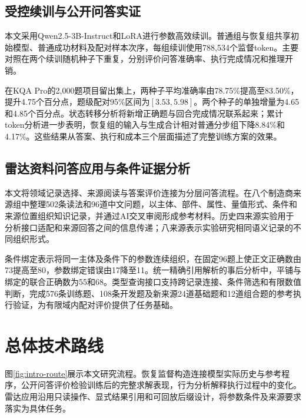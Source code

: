 \subsection{受控续训与公开问答实证}

本文采用Qwen2.5-3B-Instruct和LoRA进行参数高效续训。普通组与恢复组共享初始模型、普通成功材料及配对样本次序，每组续训使用788,534个监督token。主要对照在两个续训随机种子下重复，分别评价问答准确率、执行完成情况和推理开销。

在KQA Pro的2,000题项目留出集上，两种子平均准确率由78.75\%提高至83.50\%，提升4.75个百分点，题级配对95\%区间为$[3.53,5.98]$。两个种子的单独增量为4.65和4.85个百分点。状态转移分析将新增正确题与回合完成情况联系起来；累计token分析进一步表明，恢复组的输入与生成合计相对普通分步组下降8.84\%和4.17\%。这些结果从答案、执行和成本三个层面描述了完整训练方案的效果。

\subsection{雷达资料问答应用与条件证据分析}

本文将领域记录选择、来源阅读与答案评价连接为分层问答流程。在八个制造商来源组中整理502条读法和96道中文问题，以主体、部件、属性、量值形式、条件和来源位置组织知识记录，并通过AI交叉审阅形成参考材料。历史四来源实验用于分析接口适配和来源回答之间的信息传递；八来源表示实验研究相同语义记录的不同组织形式。

条件绑定表示将同一主体及条件下的参数连续组织，在固定96题上使正文正确数由73提高至80，参数绑定错误由17降至11。统一精确引用解析的事后分析中，平铺与绑定的联合正确数为55和68。类型查询接口支持跨记录连接、条件筛选和有限数值判断，完成576条训练题、108条开发题及新来源24道基础题和12道组合题的参考执行验证，为有限域内配对评价提供了任务基础。

\section{总体技术路线}

图\ref{fig:intro-route}展示本文研究流程。恢复监督构造连接模型实际历史与参考程序，公开问答评价检验训练后的完整求解表现，行为分析解释执行过程中的变化。雷达应用沿用只读操作、显式结果引用和可回放后缀设计，将参数条件及来源要求落实为具体任务。

